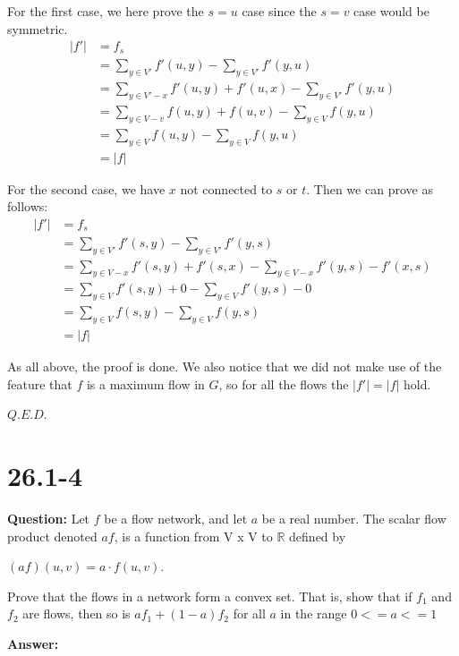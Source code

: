 \documentclass[12pt]{article}
\begin{document}
For the first case, we here prove the $s=u$ case since the $s=v$ case would be symmetric.
\begin{equation}
\begin{aligned}
 |f'| &= f_s\\
 &= \sum_{y \in V'} f'(u,y) - \sum_{y \in V'} f'(y,u) \\
 &= \sum_{y \in V'-{x}} f'(u,y) + f'(u,x) - \sum_{y \in V'} f'(y,u)\\
 &= \sum_{y \in V-{v}} f(u,y) + f(u,v) - \sum_{y \in V} f(y,u)\\
 &= \sum_{y \in V} f(u,y)  - \sum_{y \in V} f(y,u)\\
 &=|f|
\end{aligned}
 \end{equation}

For the second case, we have $x$ not connected to $s$ or $t$. Then we can prove as follows:
\begin{equation}
\begin{aligned}
 |f'| &= f_s\\
 &= \sum_{y \in V'} f'(s,y) - \sum_{y \in V'} f'(y,s) \\
 &= \sum_{y \in V-{x}} f'(s,y) + f'(s,x) - \sum_{y \in V-{x}} f'(y,s) - f'(x,s) \\
 &= \sum_{y \in V} f'(s,y) + 0 - \sum_{y \in V} f'(y,s) - 0 \\
 &= \sum_{y \in V} f(s,y) - \sum_{y \in V} f(y,s)  \\
 &= |f|
 \end{aligned}
 \end{equation}

As all above, the proof is done. We also notice that we did not make use of the feature that $f$ is a maximum flow in $G$, so for all the flows the $|f'| =|f|$ hold.

$Q.E.D.$
\section{26.1-4}
\textbf{Question: } Let $f$ be a flow network, and let $a$ be a real number. The scalar flow product denoted $af$, is a function from V x V to $\mathbb{R}$ defined by 

$(af)(u, v) = a \cdot f(u, v).$

Prove that the flows in a network form a convex set. That is, show that if $f_1$ and $f_2$ are flows, then so is $af_1+(1-a)f_2$ for all $a$ in the range $0<=a<=1$

\textbf{Answer:}
\end{document}
